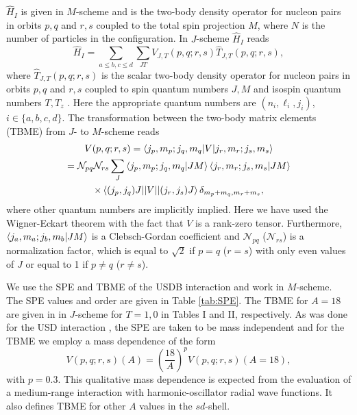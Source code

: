 $\hat H_I$ is given in $M$-scheme and is the two-body density operator for nucleon pairs in orbits $p,q$ and $r,s$ coupled to the total spin projection $M$, where $N$ is the number of particles in the configuration. In $J$-scheme $\hat H_I$ reads 
\begin{equation}
	\hat H_I =  \sum_{a\leq b,c \leq d} \sum_{JT} V_{J,T}(p,q;r,s) \hat T_{J,T}(p,q;r,s),
\end{equation}
where $\hat T_{J,T}(p,q;r,s)$ is the scalar two-body density operator for nucleon pairs in orbits $p,q$ and $r,s$ coupled to spin quantum numbers $J,M$ and isospin quantum numbers $T,T_z$ \cite{Brown2006}. Here the appropriate quantum numbers are $(n_i,\ell_i,j_i)$, $i \in \{a,b,c,d\}$. The transformation between the two-body matrix elements (TBME) from $J$- to $M$-scheme reads
\begin{multline}
	V(p,q;r,s)  =  \braket{j_{p},m_{p};j_{q},m_{q}|V|j_{r},m_{r};j_{s},m_{s}} \\ 
			    =  \mathcal{N}_{pq} \mathcal{N}_{rs} \sum_{J} \braket{j_{p},m_{p};j_{q},m_{q}|JM} \braket{j_{r},m_{r};j_{s},m_{s}|JM} \\
			   	\times \braket{(j_{p},j_{q})J||V||(j_{r},j_{s})J} \delta_{m_p+m_q,m_r+m_s},
\end{multline}
where other quantum numbers are implicitly implied. Here we have used the Wigner-Eckart theorem with the fact that $ V $ is a rank-zero tensor. Furthermore, $\braket{j_{a},m_{a};j_{b},m_{b}|JM}$ is a Clebsch-Gordan coefficient and $ \mathcal{N}_{pq} $ ($ \mathcal{N}_{rs} $) is a normalization factor, which is equal to $ \sqrt{2} $ if $ p=q $ ($ r=s $) with only even values of $ J $ or equal to 1 if $ p \not=q $ ($ r \not=s $).

We use the SPE and TBME of the USDB interaction \cite{Brown2006} and work in $M$-scheme. The SPE values and order are given in Table \ref{tab:SPE}. The TBME for $A=18$ are given in \cite{Brown2006} in $J$-scheme for $T=1,0$ in Tables I and II, respectively. As was done for the USD interaction \cite{Wildenthal1984}, the SPE are taken to be mass independent and for the TBME we employ a mass dependence of the form
\begin{equation}
	V(p,q;r,s)(A) = \left( \frac{18}{A} \right)^p V(p,q;r,s)(A=18),
\end{equation}
with $p=0.3$. This qualitative mass dependence is expected from the evaluation of a medium-range interaction with harmonic-oscillator radial wave functions. It also defines TBME for other $A$ values in the $sd$-shell.

